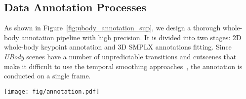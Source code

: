 \documentclass[10pt,twocolumn,letterpaper]{article}
\newcommand{\dataname}{\emph{UBody}\xspace}
\begin{document}
\subsection{Data Annotation Processes}
\label{sec:ubody_annotation}

As shown in Figure~\ref{fig:ubody_annotation_sup}, we design a thorough whole-body annotation pipeline with high precision. It is divided into two stages: 2D whole-body keypoint annotation and 3D SMPLX annotations fitting.
Since \dataname scenes have a number of unpredictable transitions and cutscenes that make it difficult to use the temporal smoothing approaches~\cite{young1995gaus1d,press1990savitzky,zeng2022smoothnet}, the annotation is conducted on a single frame.

\begin{figure*}[h]
\centering
\texttt{[image: fig/annotation.pdf]}
\vspace{-0.5cm}
\caption{
Illustration of the annotation pipeline of \dataname. Black lines show the annotation process of 2D whole-body keypoints, and blue lines are the 3D SMPL-X annotation procedure. Red dotted lines mean to update the information.
}
\label{fig:ubody_annotation_sup}
\vspace{-0.3cm}
\end{figure*}
\end{document}
